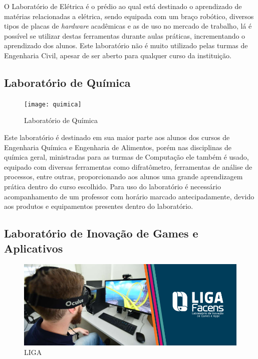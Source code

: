 \documentclass[
	12pt,				%
	oneside,			%
	a4paper,			%
	chapter=TITLE,		%
	section=TITLE,		%
	sumario=tradicional %
	english,			%
	french,				%
	spanish,			%
	brazil				%
	]{abntex2}
\begin{document}
O Laboratório de Elétrica é o prédio ao qual está destinado o aprendizado de matérias relacionadas a elétrica, sendo equipada com um braço robótico, diversos tipos de placas de \textit{hardware} acadêmicas e as de uso no mercado de trabalho, lá é possível se utilizar destas ferramentas durante aulas práticas, incrementando o aprendizado dos alunos. Este laboratório não é muito utilizado pelas turmas de Engenharia Civil, apesar de ser aberto para qualquer curso da instituição.

\subsection{Laboratório de Química}

\begin{figure}[htb]
	\caption{\label{fig:quimica} Laboratório de Química}
	\begin{center}
		\texttt{[image: quimica]}
	\end{center}
\end{figure}

Este laboratório é destinado em sua maior parte aos alunos dos cursos de Engenharia Química e Engenharia de Alimentos, porém nas disciplinas de química geral, ministradas para as turmas de Computação ele também é usado, equipado com diversas ferramentas como difratômetro, ferramentas de análise de processos, entre outras, proporcionando aos alunos uma grande aprendizagem prática dentro do curso escolhido. Para uso do laboratório é necessário acompanhamento de um professor com horário marcado antecipadamente, devido aos produtos e equipamentos presentes dentro do laboratório.

\subsection{Laboratório de Inovação de Games e Aplicativos}

\begin{figure}[htb]
	\caption{\label{fig:liga} LIGA}
	\begin{center}
		\includegraphics[scale=0.5]{liga}
	\end{center}
\end{figure}
\end{document}
